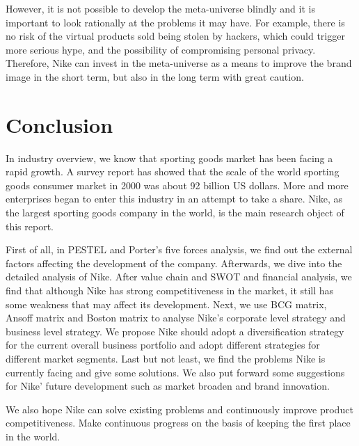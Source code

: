 \documentclass[a4paper, 12pt]{report}
\begin{document}
However, it is not possible to develop the meta-universe blindly and it is important to look rationally at the problems it may have. For example, there is no risk of the virtual products sold being stolen by hackers, which could trigger more serious hype, and the possibility of compromising personal privacy. Therefore, Nike can invest in the meta-universe as a means to improve the brand image in the short term, but also in the long term with great caution.

\chapter*{Conclusion}
In industry overview, we know that sporting goods market has been facing a rapid growth. A survey report has showed that the scale of the world sporting goods consumer market in 2000 was about 92 billion US dollars. More and more enterprises began to enter this industry in an attempt to take a share. Nike, as the largest sporting goods company in the world, is the main research object of this report.\par
First of all, in PESTEL and Porter's five forces analysis, we find out the external factors affecting the development of the company. Afterwards, we dive into the detailed analysis of Nike. After value chain and SWOT and financial analysis, we find that although Nike has strong competitiveness in the market, it still has some weakness that may affect its development. Next, we use BCG matrix, Ansoff matrix and Boston matrix to analyse Nike's corporate level strategy and business level strategy. We propose Nike should adopt a diversification strategy for the current overall business portfolio and adopt different strategies for different market segments. Last but not least, we find the problems Nike is currently facing and give some solutions. We also put forward some suggestions for Nike' future development such as market broaden and brand innovation.\par
We also hope Nike can solve existing problems and continuously improve product competitiveness. Make continuous progress on the basis of keeping the first place in the world.

\nocite{*}


\end{document}
